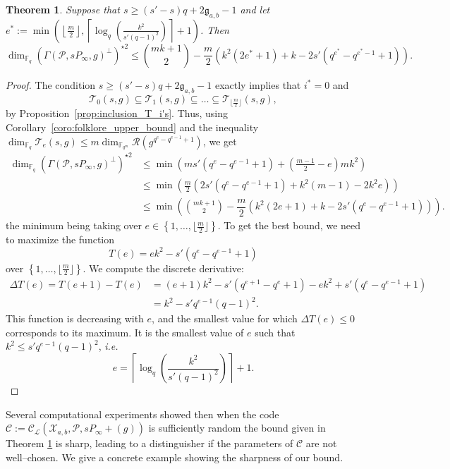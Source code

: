 \documentclass[a4paper]{amsart}
\newtheorem{thm}{Theorem}[section]
\theoremstyle{definition}
\theoremstyle{remark}
\newcommand{\calP}{\mathcal{P}}
\newcommand{\calL}{\mathcal{L}}
\newcommand{\calC}{\mathcal{C}}
\newcommand{\calR}{\mathcal{R}}
\newcommand{\calT}{\mathcal{T}}
\newcommand{\calX}{\mathcal{X}}
\newcommand{\fqm}{\mathbb{F}_{q^m}}
\newcommand{\fq}{\mathbb{F}_{q}}
\newcommand{\set}[1]{\left\{#1\right\}}
\begin{document}
\begin{thm} \label{thm:bound_with_T_i's_inclusion} 
Suppose that $s \geq (s'-s)q+2\mathfrak{g}_{a,b}-1$ and let $e^* := \min\left(\left\lfloor \frac{m}{2} \right\rfloor, \left\lceil \log_q\left(\frac{k^2}{s'(q-1)^2}\right)\right\rceil+1\right)$. Then
$$\dim_{\fq} (\Gamma(\calP,sP_\infty,g)^{\perp})^{\star 2}\leq \binom{mk+1}{2} - \dfrac{m}{2}(k^2(2e^*+1)+k-2s'(q^{e^*}-q^{e^*-1}+1)). $$
\end{thm}

\begin{proof}
The condition $s \geq (s'-s)q+2\mathfrak{g}_{a,b}-1$ exactly implies that $i^*=0$ and $$\calT_0(s,g) \subseteq \calT_1(s,g) \subseteq \dots \subseteq \calT_{\lfloor \frac{m}{2}\rfloor}(s,g),$$ 
by Proposition~\ref{prop:inclusion_T_i's}. Thus, using Corollary~\ref{coro:folklore_upper_bound} and the inequality $\dim_{\fq}\calT_e(s,g) \leq m \dim_{\fqm} \calR(g^{q^e-q^{e-1}+1})$, we get
\begin{align*}
        \dim_{\fq} (\Gamma(\calP,sP_\infty,g)^{\perp})^{\star 2}
        & \leq \min \left(ms'(q^e-q^{e-1}+1) + \left( \frac{m-1}{2} -e \right)mk^2 \right)\\
        & \leq \min \left(\frac{m}{2}\left(2s'(q^e-q^{e-1}+1)+k^2(m-1)-2k^2e  \right)\right) \\
        & \leq \min\left(\binom{mk+1}{2} - \dfrac{m}{2}\left(k^2(2e+1)+k-2s'(q^e-q^{e-1}+1)\right)\right).
\end{align*}
the minimum being taking over $e \in \set{1,\dots,\lfloor \frac{m}{2} \rfloor}$. 
To get the best bound, we need to maximize the function
$$T(e) = ek^2-s'(q^e-q^{e-1}+1)$$
over $\set{1,\dots,\lfloor \frac{m}{2} \rfloor}$.
We compute the discrete derivative:
\begin{align*}
    \Delta T(e) = T(e+1)-T(e) &= (e+1)k^2- s'(q^{e+1}-q^e+1) - ek^2 + s'(q^e-q^{e-1}+1) \\
                              &= k^2 - s'q^{e-1}(q-1)^2.
\end{align*}
This function is decreasing with $e$, and the smallest value for which $\Delta T(e) \leq 0$ corresponds to its maximum. It is the smallest value of $e$ such that $k^2 \leq s'q^{e-1}(q-1)^2$, \emph{i.e.}
$$e =  \left\lceil \log_q\left(\dfrac{k^2}{s'(q-1)^2}\right)\right\rceil+1.$$
\end{proof}

Several computational experiments showed then when the code $\calC:=\calC_{\calL}(\calX_{a,b},\calP,sP_\infty+(g))$ is sufficiently random the bound given in Theorem \ref{thm:bound_with_T_i's_inclusion} is sharp, leading to a distinguisher if the parameters of $\calC$ are not well--chosen. We give a concrete example showing the sharpness of our bound.
\end{document}
